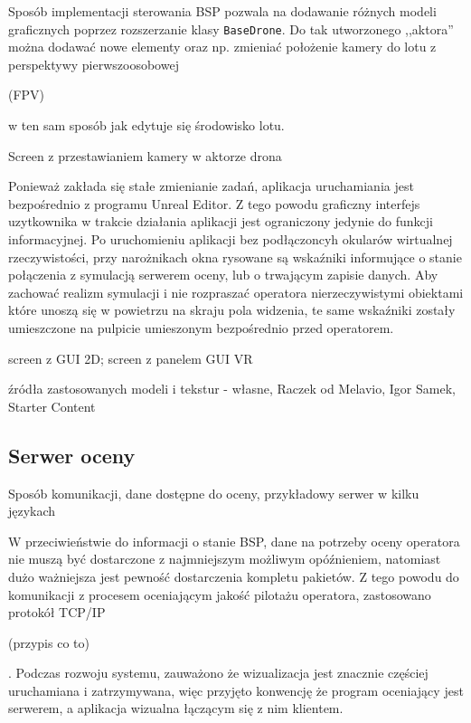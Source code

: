 Sposób implementacji sterowania BSP pozwala na dodawanie różnych modeli graficznych poprzez rozszerzanie klasy \texttt{BaseDrone}. Do tak utworzonego ,,aktora'' można dodawać nowe elementy oraz np. zmieniać położenie kamery do lotu z perspektywy pierwszoosobowej \begin{todo}(FPV)\end{todo} w ten sam sposób jak edytuje się środowisko lotu.
\begin{todo}
    Screen z przestawianiem kamery w aktorze drona
\end{todo}

Ponieważ zakłada się stałe zmienianie zadań, aplikacja uruchamiania jest bezpośrednio z programu Unreal Editor. Z tego powodu graficzny interfejs uzytkownika w trakcie działania aplikacji jest ograniczony jedynie do funkcji informacyjnej. Po uruchomieniu aplikacji bez podłączoncyh okularów wirtualnej rzeczywistości, przy narożnikach okna rysowane są wskaźniki informujące o stanie połączenia z symulacją serwerem oceny, lub o trwającym zapisie danych. Aby zachować realizm symulacji i nie rozpraszać operatora nierzeczywistymi obiektami które unoszą się w powietrzu na skraju pola widzenia, te same wskaźniki zostały umieszczone na pulpicie umieszonym bezpośrednio przed operatorem.
\begin{todo}
    screen z GUI 2D; screen z panelem GUI VR
\end{todo}

\begin{todo}
    źródła zastosowanych modeli i tekstur - własne, Raczek od Melavio, Igor Samek, Starter Content
\end{todo}

\subsection{Serwer oceny}
\begin{todo}
    Sposób komunikacji, dane dostępne do oceny, przykładowy serwer w kilku językach
\end{todo}
W przeciwieństwie do informacji o stanie BSP, dane na potrzeby oceny operatora nie muszą być dostarczone z najmniejszym możliwym opóźnieniem, natomiast dużo ważniejsza jest pewność dostarczenia kompletu pakietów. Z tego powodu do komunikacji z procesem oceniającym jakość pilotażu operatora, zastosowano protokół TCP/IP \begin{todo}(przypis co to)\end{todo}. Podczas rozwoju systemu, zauważono że wizualizacja jest znacznie częściej uruchamiana i zatrzymywana, więc przyjęto konwencję że program oceniający jest serwerem, a aplikacja wizualna łączącym się z nim klientem.

